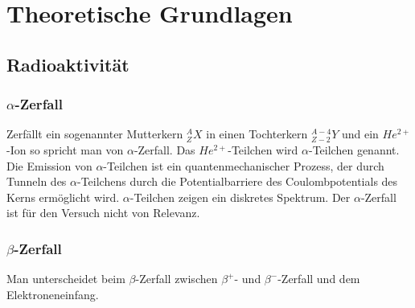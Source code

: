 \section{Theoretische Grundlagen}


\subsection{Radioaktivität}
\subsubsection{$\alpha$-Zerfall}

Zerfällt ein sogenannter Mutterkern $_Z^AX$ in einen Tochterkern $_{Z-2}^{A-4}Y$ und ein $He^{2+}$-Ion so spricht man von $\alpha$-Zerfall. Das $He^{2+}$-Teilchen wird $\alpha$-Teilchen genannt. Die Emission von $\alpha$-Teilchen ist ein quantenmechanischer Prozess, der durch Tunneln des $\alpha$-Teilchens durch die Potentialbarriere des Coulombpotentials des Kerns ermöglicht wird. $\alpha$-Teilchen zeigen ein diskretes Spektrum. Der $\alpha$-Zerfall ist für den Versuch nicht von Relevanz.

\subsubsection{$\beta$-Zerfall}

Man unterscheidet beim $\beta$-Zerfall zwischen $\beta^+$- und $\beta^-$-Zerfall und dem Elektroneneinfang.

